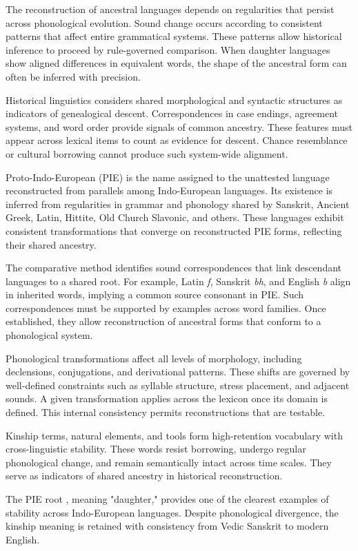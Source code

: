 The reconstruction of ancestral languages depends on regularities that persist across phonological evolution. Sound change occurs according to consistent patterns that affect entire grammatical systems. These patterns allow historical inference to proceed by rule-governed comparison. When daughter languages show aligned differences in equivalent words, the shape of the ancestral form can often be inferred with precision.

Historical linguistics considers shared morphological and syntactic structures as indicators of genealogical descent. Correspondences in case endings, agreement systems, and word order provide signals of common ancestry. These features must appear across lexical items to count as evidence for descent. Chance resemblance or cultural borrowing cannot produce such system-wide alignment.

Proto-Indo-European (PIE) is the name assigned to the unattested language reconstructed from parallels among Indo-European languages. Its existence is inferred from regularities in grammar and phonology shared by Sanskrit, Ancient Greek, Latin, Hittite, Old Church Slavonic, and others. These languages exhibit consistent transformations that converge on reconstructed PIE forms, reflecting their shared ancestry.

The comparative method identifies sound correspondences that link descendant languages to a shared root. For example, Latin \emph{f}, Sanskrit \emph{bh}, and English \emph{b} align in inherited words, implying a common source consonant in PIE. Such correspondences must be supported by examples across word families. Once established, they allow reconstruction of ancestral forms that conform to a phonological system.

Phonological transformations affect all levels of morphology, including declensions, conjugations, and derivational patterns. These shifts are governed by well-defined constraints such as syllable structure, stress placement, and adjacent sounds. A given transformation applies across the lexicon once its domain is defined. This internal consistency permits reconstructions that are testable.

Kinship terms, natural elements, and tools form high-retention vocabulary with cross-linguistic stability. These words resist borrowing, undergo regular phonological change, and remain semantically intact across time scales. They serve as indicators of shared ancestry in historical reconstruction.

The PIE root , meaning "daughter," provides one of the clearest examples of stability across Indo-European languages. Despite phonological divergence, the kinship meaning is retained with consistency from Vedic Sanskrit to modern English.

